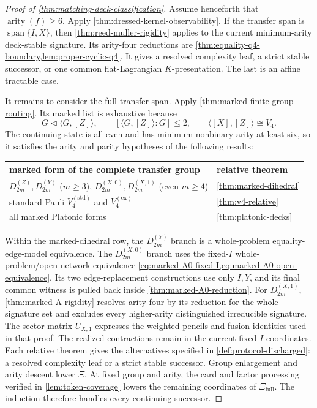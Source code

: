 \documentclass[11pt,letterpaper,onecolumn]{article}
\theoremstyle{plain}
\theoremstyle{definition}
\theoremstyle{remark}
\newcommand{\DihZ}[1]{{D_{#1}^{(Z)}}}
\newcommand{\DihY}[1]{{D_{#1}^{(Y)}}}
\newcommand{\DihXzero}[1]{{D_{#1}^{(X,0)}}}
\newcommand{\DihXone}[1]{{D_{#1}^{(X,1)}}}
\newcommand{\KleinStd}{{V_4^{(\mathrm{std})}}}
\newcommand{\KleinEx}{{V_4^{(\mathrm{ex})}}}
\newcommand{\Span}{\operatorname{span}}
\newcommand{\arity}{\operatorname{arity}}
\begin{document}
\begin{proof}[Proof of \cref{thm:matching-deck-classification}]
Assume henceforth that \(\arity(f)\ge6\).  Apply
\cref{thm:dressed-kernel-observability}.  If the transfer span is
\(\Span\{I,X\}\), then \cref{thm:reed-muller-rigidity} applies to the
current minimum-arity deck-stable signature. Its arity-four reductions
are \cref{thm:equality-q4-boundary,lem:proper-cyclic-q4}.
It gives a resolved complexity leaf, a strict stable successor, or one
common flat-Lagrangian \(K\)-presentation. The last is an affine
tractable case.

It remains to consider the full transfer span.  Apply
\cref{thm:marked-finite-group-routing}.  Its marked list is exhaustive
because
\[
 G\triangleleft\langle G,[Z]\rangle,
 \qquad [\langle G,[Z]\rangle:G]\le2,
 \qquad \langle[X],[Z]\rangle\cong V_4.
\]
The continuing state is all-even and has minimum nonbinary arity at least
six, so it satisfies the arity and parity hypotheses of the following results:
\begin{center}
\normalsize
\begin{tabular}{@{}ll@{}}
\toprule
marked form of the complete transfer group&relative theorem\\
\midrule
\(\DihZ{2m},\DihY{2m}\) (\(m\ge3\)),
\(\DihXzero{2m},\DihXone{2m}\) (even \(m\ge4\))&
\cref{thm:marked-dihedral}\\
standard Pauli \(\KleinStd\) and \(\KleinEx\)&
\cref{thm:v4-relative}\\
all marked Platonic forms&
\cref{thm:platonic-decks}\\
\bottomrule
\end{tabular}
\end{center}
Within the marked-dihedral row, the \(\DihY{2m}\) branch is a
whole-problem equality-edge-model equivalence.  The \(\DihXzero{2m}\) branch uses
the fixed-\(I\) whole-problem/open-network equivalence
\cref{eq:marked-A0-fixed-I,eq:marked-A0-open-equivalence}. Its two edge-replacement constructions use only \(I,Y\), and its final common witness is pulled back
inside \cref{thm:marked-A0-reduction}.  For \(\DihXone{2m}\),
\cref{thm:marked-A-rigidity} resolves arity four by its reduction for the whole signature set and excludes every higher-arity distinguished irreducible signature.
The sector matrix \(U_{X,1}\) expresses the weighted pencils
and fusion identities used in that proof. The realized contractions
remain in the current fixed-\(I\) coordinates.
Each relative theorem gives the alternatives specified in
\cref{def:protocol-discharged}: a resolved complexity leaf or a strict
stable successor. Group enlargement and arity descent lower \(\Xi\).
At fixed group and arity, the card and factor processing verified in
\cref{lem:token-coverage} lowers the remaining coordinates of \(\Xi_{\mathrm{full}}\).
The induction therefore handles every continuing successor.


\end{proof}
\end{document}
